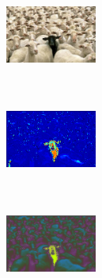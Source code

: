 \begin{figure}[t!] %
\begin{subfigure}{0.32\textwidth}
\includegraphics[height=3cm,width=3cm]{./Figures/sheep/sheep.jpg}
\caption{} 
\end{subfigure}\hspace*{\fill}
\begin{subfigure}{0.32\textwidth}
\includegraphics[height=3cm,width=3cm]{./Figures/sheep/1.png}
\caption{} 
\end{subfigure}
\begin{subfigure}{0.32\textwidth}
\includegraphics[height=3cm,width=3cm]{./Figures/sheep/2.png}
\caption{} 
\end{subfigure}


\end{figure}
